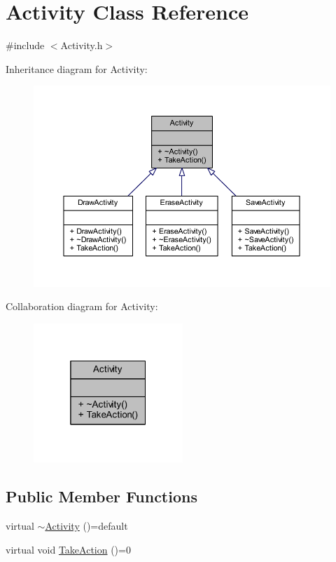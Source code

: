 \hypertarget{class_activity}{}\section{Activity Class Reference}
\label{class_activity}


{\ttfamily \#include $<$Activity.\+h$>$}



Inheritance diagram for Activity\+:
\nopagebreak
\begin{figure}[H]
\begin{center}
\leavevmode
\includegraphics[width=350pt]{class_activity__inherit__graph}
\end{center}
\end{figure}


Collaboration diagram for Activity\+:
\nopagebreak
\begin{figure}[H]
\begin{center}
\leavevmode
\includegraphics[width=160pt]{class_activity__coll__graph}
\end{center}
\end{figure}
\subsection*{Public Member Functions}
\begin{DoxyCompactItemize}
\item 
virtual \mbox{\hyperlink{class_activity_aef5c28e82c93f6da8a924d088bc9b58b}{$\sim$\+Activity}} ()=default
\item 
virtual void \mbox{\hyperlink{class_activity_af1bed13c5ae595ee7940dee2d34f7989}{Take\+Action}} ()=0
\end{DoxyCompactItemize}


